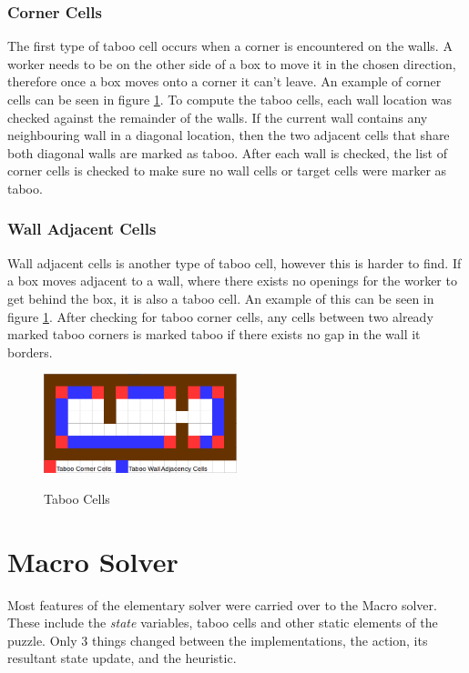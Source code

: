 \documentclass[]{article}
\begin{document}
\subsubsection{Corner Cells}
 The first type of taboo cell occurs when a corner is encountered on the walls. A worker needs to be on the other side of a box to move it in the chosen direction, therefore once a box moves onto a corner it can't leave. An example of corner cells can be seen in figure \ref{TabooCells}. To compute the taboo cells, each wall location was checked against the remainder of the walls. If the current wall contains any neighbouring wall in a diagonal location, then the two adjacent cells that share both diagonal walls are marked as taboo. After each wall is checked, the list of corner cells is checked to make sure no wall cells or target cells were marker as taboo. 
\subsubsection{Wall Adjacent Cells}
Wall adjacent cells is another type of taboo cell, however this is harder to find. If a box moves adjacent to a wall, where there exists no openings for the worker to get behind the box, it is also a taboo cell. An example of this can be seen in figure \ref{TabooCells}. After checking for taboo corner cells, any cells between two already marked taboo corners is marked taboo if there exists no gap in the wall it borders.
\begin{figure}[H]
	\centering
	\caption{Taboo Cells}
	\includegraphics[width=0.5\textwidth]{TabooCells.png}
	\label{TabooCells}
\end{figure}
\section{Macro Solver}
Most features of the elementary solver were carried over to the Macro solver. These include the \textit{state} variables, taboo cells and other static elements of the puzzle. Only 3 things changed between the implementations, the action, its resultant state update, and the heuristic.
\end{document}

